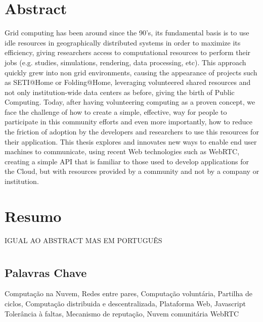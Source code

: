 \chapter*{Abstract}
\thispagestyle{empty}

Grid computing has been around since the 90's, its fundamental basis is to use idle resources in geographically distributed systems in order to maximize its efficiency, giving researchers access to computational resources to perform their jobs (e.g. studies, simulations, rendering, data processing, etc). This approach quickly grew into non grid environments, causing the appearance of projects such as SETI@Home or Folding@Home, leveraging volunteered shared resources and not only institution-wide data centers as before, giving the birth of Public Computing. Today, after having volunteering computing as a proven concept, we face the challenge of how to create a simple, effective, way for people to participate in this community efforts and even more importantly, how to reduce the friction of adoption by the developers and researchers to use this resources for their application. This thesis explores and innovates new ways to enable end user machines to communicate, using recent Web technologies such as WebRTC, creating a simple API that is familiar to those used to develop applications for the Cloud, but with resources provided by a community and not by a company or institution.


\newpage
\chapter*{Resumo}
\thispagestyle{empty}

IGUAL AO ABSTRACT MAS EM PORTUGUÊS



\newpage
\chapter*{}
\thispagestyle{empty}

\section*{Palavras Chave}
{\large
    \noindent Computa\c{c}\~ao na Nuvem,
    \noindent Redes entre pares,
    \noindent Computação voluntária,
    \noindent Partilha de ciclos,
    \noindent Computa\c{c}\~ao distribuida e descentralizada,
    \noindent Plataforma Web,
    \noindent Javascript
    \noindent Tolerância à faltas,
    \noindent Mecanismo de reputação,
    \noindent Nuvem comunitária
    \noindent WebRTC
}

